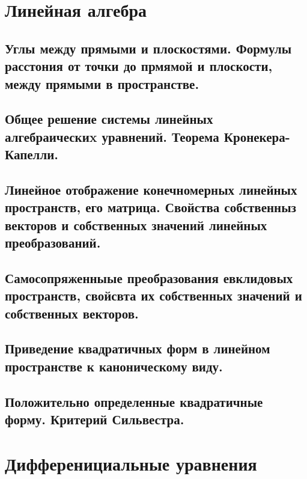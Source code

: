 \documentclass{urticle}
\theoremstyle{definition}
\begin{document}
\section{Линейная алгебра}
\label{LinAlgebra}

\subsection{Углы между прямыми и плоскостями. Формулы расстония от точки до прмямой и плоскости, между прямыми в пространстве.}
\subsection{Общее решение системы линейных алгебраическиx уравнений. Теорема Кронекера-Капелли.}
\subsection{Линейное отображение конечномерных линейных пространств, его матрица. Свойства собственныз векторов и собственных значений линейных преобразований.}
\subsection{Самосопряженныые преобразования евклидовых пространств, свойсвта их собственных значений и собственных векторов.}
\subsection{Приведение квадратичных форм в линейном пространстве к каноническому виду.}
\subsection{Положительно определенные квадратичные форму. Критерий Сильвестра.}

\section{Дифференициальные уравнения}
\label{DiffEq}



\end{document}
